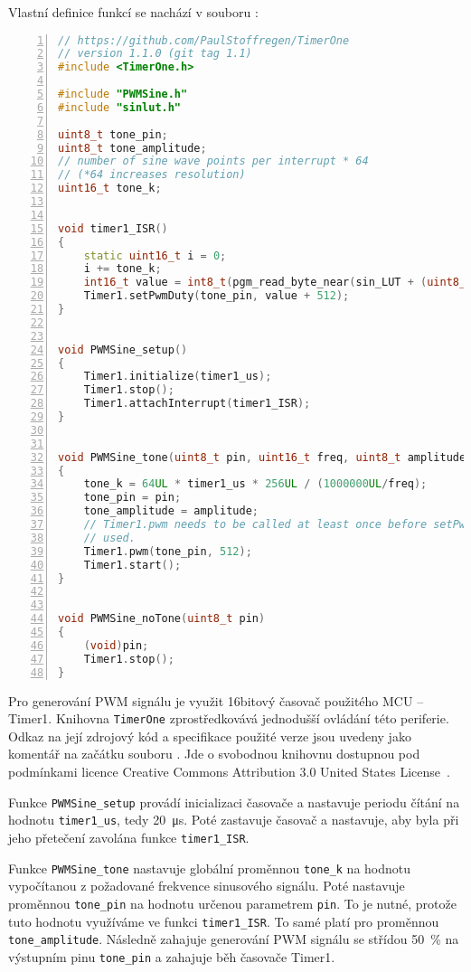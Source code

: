 Vlastní definice funkcí se nachází v souboru :
\begin{lstlisting}[language=C++,numbers=left]
// https://github.com/PaulStoffregen/TimerOne
// version 1.1.0 (git tag 1.1)
#include <TimerOne.h>

#include "PWMSine.h"
#include "sinlut.h"

uint8_t tone_pin;
uint8_t tone_amplitude;
// number of sine wave points per interrupt * 64
// (*64 increases resolution)
uint16_t tone_k;


void timer1_ISR()
{
    static uint16_t i = 0;
    i += tone_k;
    int16_t value = int8_t(pgm_read_byte_near(sin_LUT + (uint8_t)(i/64))) * tone_amplitude / 64;
    Timer1.setPwmDuty(tone_pin, value + 512);
}


void PWMSine_setup()
{
    Timer1.initialize(timer1_us);
    Timer1.stop();
    Timer1.attachInterrupt(timer1_ISR);
}


void PWMSine_tone(uint8_t pin, uint16_t freq, uint8_t amplitude)
{
    tone_k = 64UL * timer1_us * 256UL / (1000000UL/freq);
    tone_pin = pin;
    tone_amplitude = amplitude;
    // Timer1.pwm needs to be called at least once before setPwmDuty can be
    // used.
    Timer1.pwm(tone_pin, 512);
    Timer1.start();
}


void PWMSine_noTone(uint8_t pin)
{
    (void)pin;
    Timer1.stop();
}
\end{lstlisting}

Pro generování PWM signálu je využit 16bitový časovač použitého MCU -- Timer1.
Knihovna \texttt{TimerOne} zprostředkovává jednodušší ovládání této periferie.
Odkaz na její zdrojový kód a specifikace použité verze jsou uvedeny jako
komentář na začátku souboru . Jde o svobodnou knihovnu
dostupnou pod podmínkami licence Creative Commons Attribution 3.0 United States
License~\cite{TimerOnerepo}.

Funkce \verb|PWMSine_setup| provádí inicializaci časovače a nastavuje periodu
čítání na hodnotu \verb|timer1_us|, tedy \SI{20}{\micro\second}. Poté
zastavuje časovač a nastavuje, aby byla při jeho přetečení zavolána funkce
\verb|timer1_ISR|.

Funkce \verb|PWMSine_tone| nastavuje globální proměnnou \verb|tone_k| na
hodnotu vypočítanou z požadované frekvence sinusového signálu.
Poté nastavuje proměnnou \verb|tone_pin| na hodnotu určenou parametrem
\texttt{pin}. To je nutné, protože tuto hodnotu využíváme ve funkci
\verb|timer1_ISR|. To samé platí pro proměnnou \verb|tone_amplitude|.
Následně zahajuje generování PWM signálu se střídou \SI{50}{\percent} na
výstupním pinu \verb|tone_pin| a zahajuje běh časovače Timer1.

